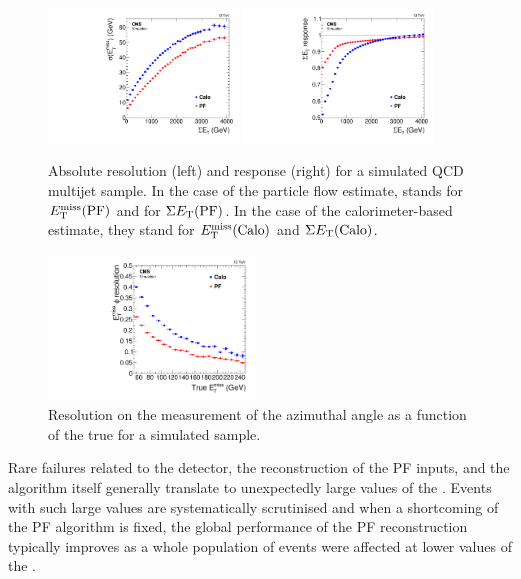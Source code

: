 \begin{figure}[htbp]
\centering
\includegraphics[width=0.45\textwidth]{figs/cms/met_sigma_vs_sumet.pdf}
\includegraphics[width=0.45\textwidth]{figs/cms/met_response_vs_sumet.pdf}
\caption{Absolute \MET resolution (left) and \sumET response (right) for a simulated QCD multijet sample.
In the case of the particle flow estimate, \MET stands for $E_{\mathrm{T}}^{\text{miss}} ({\mathrm{PF}})$ and \sumET for $\Sigma E_\textrm{T} ({\mathrm{PF}})$. In the case of the calorimeter-based estimate, they stand for $E_{\mathrm{T}}^{\text{miss}} ({\mathrm{Calo}})$ and $\Sigma E_\textrm{T} ({\mathrm{Calo}})$.\label{fig:expected_performance_met}}
\end{figure}

\begin{figure}[htbp]
\centering
\includegraphics[width=0.49\textwidth]{figs/cms/met_phi_vs_truemet.pdf}
\caption{
Resolution on the measurement of the \vecMET azimuthal angle as a function of the true \MET for a simulated \ttbar sample.
\label{fig:expected_performance_met_phi_resolution}}
\end{figure}

Rare failures related to the detector, the reconstruction of the PF inputs, 
and the algorithm itself generally translate to unexpectedly large values of the \MET.
Events with such large values are systematically scrutinised and when a shortcoming of the PF algorithm is fixed, 
the global performance of the PF reconstruction typically improves as a whole population of events were affected at lower values
of the \MET. 

